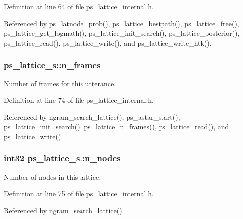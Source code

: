 Definition at line 64 of file ps\-\_\-lattice\-\_\-internal.\-h.



Referenced by ps\-\_\-latnode\-\_\-prob(), ps\-\_\-lattice\-\_\-bestpath(), ps\-\_\-lattice\-\_\-free(), ps\-\_\-lattice\-\_\-get\-\_\-logmath(), ps\-\_\-lattice\-\_\-init\-\_\-search(), ps\-\_\-lattice\-\_\-posterior(), ps\-\_\-lattice\-\_\-read(), ps\-\_\-lattice\-\_\-write(), and ps\-\_\-lattice\-\_\-write\-\_\-htk().

\subsubsection[{n\-\_\-frames}]{ ps\-\_\-lattice\-\_\-s\-::n\-\_\-frames}\label{structps__lattice__s_a3a997dc60d28b84d5bfc01f9ce25a891}


Number of frames for this utterance. 



Definition at line 74 of file ps\-\_\-lattice\-\_\-internal.\-h.



Referenced by ngram\-\_\-search\-\_\-lattice(), ps\-\_\-astar\-\_\-start(), ps\-\_\-lattice\-\_\-init\-\_\-search(), ps\-\_\-lattice\-\_\-n\-\_\-frames(), ps\-\_\-lattice\-\_\-read(), and ps\-\_\-lattice\-\_\-write().

\subsubsection[{n\-\_\-nodes}]{\setlength{\rightskip}{0pt plus 5cm}int32 ps\-\_\-lattice\-\_\-s\-::n\-\_\-nodes}\label{structps__lattice__s_adcc3bdadae1f3e3ace2d36548983ae78}


Number of nodes in this lattice. 



Definition at line 75 of file ps\-\_\-lattice\-\_\-internal.\-h.



Referenced by ngram\-\_\-search\-\_\-lattice().

